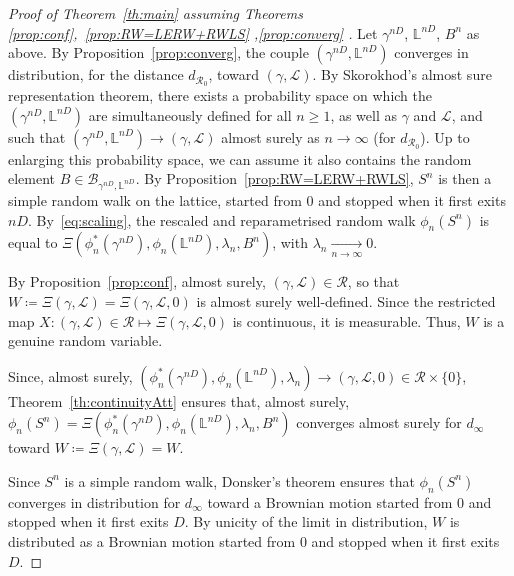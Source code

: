 \documentclass[11pt]{article}
\def\Conf{{\mathscr{R}}}
\def\Att{{\Xi}}
\begin{document}
\begin{proof}[Proof of Theorem~\ref{th:main} assuming Theorems %
\ref{prop:conf},~\ref{prop:RW=LERW+RWLS}  ,\ref{prop:converg} ]
  Let $\gamma^{nD}$, $\mathbb{L}^{nD}$, $B^n$ as above. By Proposition~\ref{prop:converg}, the couple $(\gamma^{nD},\mathbb{L}^{nD})$ converges in distribution, for the distance $d_{\Conf_0}$, toward $(\gamma,\mathcal{L})$. By Skorokhod's almost sure representation theorem, there exists a probability space on which the $(\gamma^{nD},\mathbb{L}^{nD})$
  are simultaneously defined for all $n\geq 1$, as well as $\gamma$ and $\mathcal{L}$, and such that $(\gamma^{nD},\mathbb{L}^{nD})\to (\gamma,\mathcal{L})$ almost surely as $n\to \infty$ (for  $d_{\Conf_0}$).
  Up to enlarging this probability space, we can assume it also contains the random element $B\in\mathcal{B}_{\gamma^{nD}, \mathbb{L}^{nD}} $. By
  Proposition~\ref{prop:RW=LERW+RWLS}, $S^n$ is then a simple random walk on the lattice, started from $0$ and stopped when it first exits $nD$. By~\eqref{eq:scaling}, the rescaled and reparametrised random walk $\phi_n(S^n)$ is equal to $\Att(\phi_n^*(\gamma^{nD}),\phi_n(\mathbb{L}^{nD}),\lambda_n,B^n)$, with $\lambda_n\underset{n\to \infty}\longrightarrow 0$.

  By Proposition~\ref{prop:conf}, almost surely, $ (\gamma, \mathcal{L}) \in \Conf$, so that $W\coloneqq \Att(\gamma, \mathcal{L})=\Att(\gamma, \mathcal{L},0)$ is almost surely well-defined. Since the restricted map $ X:(\gamma, \mathcal{L}) \in \Conf\mapsto  \Att(\gamma, \mathcal{L},0)$ is continuous, it is measurable. Thus, $W$ is a genuine random variable.

  Since, almost surely, $ (\phi_n^*(\gamma^{nD}),\phi_n(\mathbb{L}^{nD}),\lambda_n)\longrightarrow (\gamma,\mathcal{L},0)\in \Conf\times \{0\}$, %
  Theorem~\ref{th:continuityAtt} ensures that, almost surely, $\phi_n(S^n)=\Att(\phi_n^*(\gamma^{nD}),\phi_n(\mathbb{L}^{nD}),\lambda_n,B^n)$ converges almost surely for $d_\infty$ toward $W\coloneqq \Att(\gamma,\mathcal{L})=W$.

  Since $S^n$ is a simple random walk, Donsker's theorem ensures that $\phi_n(S^n)$ converges in distribution for $d_\infty$ toward a Brownian motion started from $0$ and stopped when it first exits $D$. By unicity of the limit in distribution, $W$ is distributed as a Brownian motion started from $0$ and stopped when it first exits $D$.
\end{proof}
\end{document}
